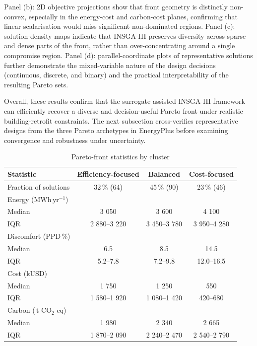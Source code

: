 \documentclass[11pt]{article}
\providecommand{\yr}{\,\text{yr}^{-1}}
\providecommand{\tCO}{\,\text{t CO}_2\text{-eq}}
\providecommand{\PPD}{\text{PPD}}
\begin{document}
Panel (b): 2D objective projections show that front geometry is distinctly non-convex, especially in the energy-cost and carbon-cost planes, confirming that linear scalarisation would miss significant non-dominated regions. Panel (c): solution-density maps indicate that INSGA-III preserves diversity across sparse and dense parts of the front, rather than over-concentrating around a single compromise region. Panel (d): parallel-coordinate plots of representative solutions further demonstrate the mixed-variable nature of the design decisions (continuous, discrete, and binary) and the practical interpretability of the resulting Pareto sets.

Overall, these results confirm that the surrogate-assisted INSGA-III framework can efficiently recover a diverse and decision-useful Pareto front under realistic building-retrofit constraints. The next subsection cross-verifies representative designs from the three Pareto archetypes in EnergyPlus before examining convergence and robustness under uncertainty.

\begin{table}[H]
\centering
\caption{Pareto-front statistics by cluster}
\label{tab:pareto_clusters}
\begin{tabular}{lccc}
\toprule
Statistic               & Efficiency-focused & Balanced      & Cost-focused \\
\midrule
Fraction of solutions   & 32\,\% (64)        & 45\,\% (90)   & 23\,\% (46) \\
Energy (MWh$\yr$)       &                    &               & \\
\quad Median            & 3 050              & 3 600         & 4 100 \\
\quad IQR               & 2 880–3 220        & 3 450–3 780   & 3 950–4 280 \\
Discomfort ($\PPD$\,\%)  &                    &               & \\
\quad Median            & 6.5                & 8.5           & 14.5 \\
\quad IQR               & 5.2–7.8            & 7.2–9.8       & 12.0–16.5 \\
Cost (kUSD)             &                    &               & \\
\quad Median            & 1 750              & 1 250         & 550 \\
\quad IQR               & 1 580–1 920        & 1 080–1 420   & 420–680 \\
Carbon ($\tCO$)         &                    &               & \\
\quad Median            & 1 980              & 2 340         & 2 665 \\
\quad IQR               & 1 870--2 090       & 2 240--2 470  & 2 540--2 790 \\
\bottomrule
\end{tabular}
\end{table}
\end{document}

